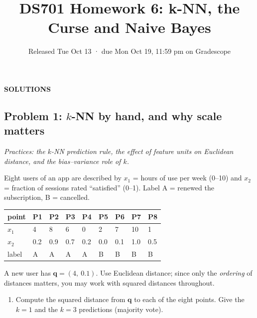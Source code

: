 \documentclass[
  11pt,
]{article}
\title{DS701 Homework 6: k-NN, the Curse and Naive Bayes}
\subtitle{Released Tue Oct 13 · due Mon Oct 19, 11:59 pm on Gradescope}
\author{}
\date{}
\newcounter{none} %
\providecommand{\tightlist}{%
  \setlength{\itemsep}{0pt}\setlength{\parskip}{0pt}}
\newcommand{\answerspace}[1]{\par\vspace*{#1}}  %
\newcommand{\answerpage}{\clearpage}
\begin{document}
\maketitle


\begin{center}\LARGE\bfseries\color{blue!45!black} SOLUTIONS\end{center}
\renewcommand{\answerspace}[1]{}
\renewcommand{\answerpage}{\par\vspace{6pt}}

\subsection{\texorpdfstring{Problem 1: \(k\)-NN by hand, and why scale
matters}{Problem 1: k-NN by hand, and why scale matters}}\label{problem-1-k-nn-by-hand-and-why-scale-matters}

\emph{Practices: the \(k\)-NN prediction rule, the effect of feature
units on Euclidean distance, and the bias--variance role of \(k\).}

Eight users of an app are described by \(x_1\) = hours of use per week
(0--10) and \(x_2\) = fraction of sessions rated ``satisfied'' (0--1).
Label A = renewed the subscription, B = cancelled.

{\def\LTcaptype{none} %
\begin{longtable}[]{@{}lllllllll@{}}
\toprule\noalign{}
point & P1 & P2 & P3 & P4 & P5 & P6 & P7 & P8 \\
\midrule\noalign{}
\endhead
\bottomrule\noalign{}
\endlastfoot
\(x_1\) & 4 & 8 & 6 & 0 & 2 & 7 & 10 & 1 \\
\(x_2\) & 0.2 & 0.9 & 0.7 & 0.2 & 0.0 & 0.1 & 1.0 & 0.5 \\
label & A & A & A & A & B & B & B & B \\
\end{longtable}
}

A new user has \(\mathbf{q} = (4,\ 0.1)\). Use Euclidean distance; since
only the \emph{ordering} of distances matters, you may work with squared
distances throughout.

\answerpage

\begin{enumerate}
\def\labelenumi{(\alph{enumi})}
\tightlist
\item
  Compute the squared distance from \(\mathbf{q}\) to each of the eight
  points. Give the \(k = 1\) and the \(k = 3\) predictions (majority
  vote).
\end{enumerate}
\end{document}
